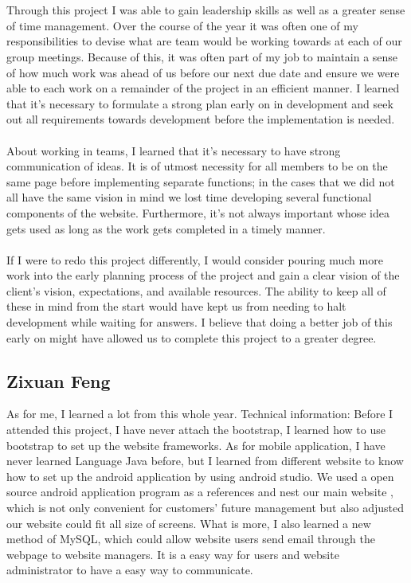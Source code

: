 \documentclass[onecolumn, draftclsnofoot,10pt, compsoc]{IEEEtran}
\begin{document}
\\ \\
Through this project I was able to gain leadership skills as well as a greater sense of time management. Over the course of the year it was often one of my responsibilities to devise what are team would be working towards at each of our group meetings. Because of this, it was often part of my job to maintain a sense of how much work was ahead of us before our next due date and ensure we were able to each work on a remainder of the project in an efficient manner. I learned that it's necessary to formulate a strong plan early on in development and seek out all requirements towards development before the implementation is needed. 
\\ \\
About working in teams, I learned that it's necessary to have strong communication of ideas. It is of utmost necessity for all members to be on the same page before implementing separate functions; in the cases that we did not all have the same vision in mind we lost time developing several functional components of the website. Furthermore, it's not always important whose idea gets used as long as the work gets completed in a timely manner. 
\\ \\
If I were to redo this project differently, I would consider pouring much more work into the early planning process of the project and gain a clear vision of the client's vision, expectations, and available resources. The ability to keep all of these in mind from the start would have kept us from needing to halt development while waiting for answers. I believe that doing a better job of this early on might have allowed us to complete this project to a greater degree.

\subsection{Zixuan Feng}
\noindent As for me, I learned a lot from this whole year. 
Technical information: Before I attended this project, I have never attach the bootstrap, I learned how to use bootstrap to set up the website frameworks. As for mobile application, I have never learned Language Java before, but I learned from different website to know how to set up the android application by using android studio. We used a open source android application program as a references and nest our main website , which is not only convenient for customers’ future management but also adjusted our website could fit all size of screens. What is more, I also learned a new method of MySQL, which could allow website users send email through the webpage to website managers. It is a easy way for users and website administrator to have a easy way to communicate. \\
\end{document}
